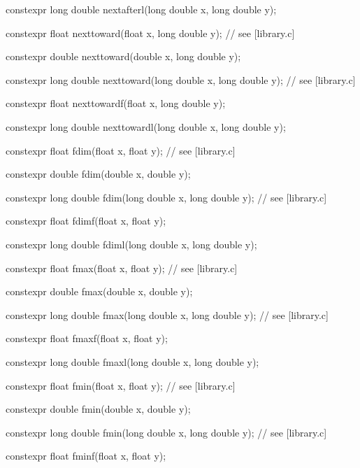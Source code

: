 \documentclass[prd,twocolumn,amsmath,amssymb,nofootinbib,eqsecnum]{revtex4-1}
\newcommand{\highlight}[1]{{\color{red} #1}}
\begin{document}
\begin{widetext}
{\highlight{constexpr}  long double nextafterl(long double x, long double y);

\vspace{2ex}

\highlight{constexpr}  float nexttoward(float x, long double y); // see [library.c]

\highlight{constexpr}  double nexttoward(double x, long double y);

\highlight{constexpr}  long double nexttoward(long double x, long double y); // see [library.c]

\highlight{constexpr}  float nexttowardf(float x, long double y);

\highlight{constexpr}  long double nexttowardl(long double x, long double y);

\vspace{2ex}

\highlight{constexpr}  float fdim(float x, float y); // see [library.c]

\highlight{constexpr}  double fdim(double x, double y);

\highlight{constexpr}  long double fdim(long double x, long double y); // see [library.c]

\highlight{constexpr}  float fdimf(float x, float y);

\highlight{constexpr}  long double fdiml(long double x, long double y);

\vspace{2ex}

\highlight{constexpr}  float fmax(float x, float y); // see [library.c]

\highlight{constexpr}  double fmax(double x, double y);

\highlight{constexpr}  long double fmax(long double x, long double y); // see [library.c]

\highlight{constexpr}  float fmaxf(float x, float y);

\highlight{constexpr}  long double fmaxl(long double x, long double y);

\vspace{2ex}

\highlight{constexpr} float fmin(float x, float y); // see [library.c]

\highlight{constexpr}  double fmin(double x, double y);

\highlight{constexpr}  long double fmin(long double x, long double y); // see [library.c]

\highlight{constexpr}  float fminf(float x, float y);

}
\end{widetext}
\end{document}
